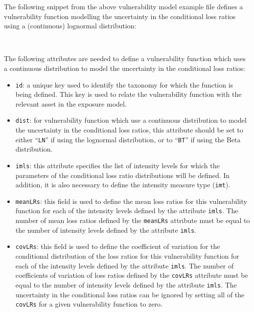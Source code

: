 The following snippet from the above \gls{vulnerability model} example file defines
a \gls{vulnerability function} modelling the uncertainty in the conditional loss
ratios using a (continuous) lognormal distribution:

\inputminted[firstline=10,firstnumber=10,lastline=14,fontsize=\footnotesize,frame=single,linenos,bgcolor=lightgray]{xml}{oqum/risk/Verbatim/input_vulnerability.xml}\\

The following attributes are needed to define a \gls{vulnerability function} which
uses a continuous distribution to model the uncertainty in the conditional
loss ratios:

\begin{itemize}

    \item \Verb+id+: a unique key used to identify the \gls{taxonomy} for 
    which the function is being defined. This key is used to relate the 
    \gls{vulnerability function} with the relevant \gls{asset} in the 
    \gls{exposure model}.

    \item \Verb+dist+: for vulnerability function which use a continuous 
    distribution to model the uncertainty in the conditional loss ratios, 
    this attribute should be set to either ``\Verb+LN+'' if using the lognormal
    distribution, or to ``\Verb+BT+'' if using the Beta distribution.

    \item \Verb+imls+: this attribute specifies the list of intensity levels
    for which the parameters of the conditional loss ratio distributions will
    be defined. In addition, it is also necessary to define the intensity 
    measure type (\Verb+imt+).

    \item \Verb+meanLRs+: this field is used to define the mean loss ratios
    for this \gls{vulnerability function} for each of the intensity levels
    defined by the attribute \Verb+imls+. The number of mean loss ratios
    defined by the \Verb+meanLRs+ attribute must be equal to the number of
    intensity levels defined by the attribute \Verb+imls+.

    \item \Verb+covLRs+: this field is used to define the coefficient of 
    variation for the conditional distribution of the loss ratios for this
    \gls{vulnerability function} for each of the intensity levels defined by
    the attribute \Verb+imls+. The number of coefficients of variation of loss
    ratios defined by the \Verb+covLRs+ attribute must be equal to the number
    of intensity levels defined by the attribute \Verb+imls+. The uncertainty
    in the conditional loss ratios can be ignored by setting all of the
    \Verb+covLRs+ for a given \gls{vulnerability function} to zero.

\end{itemize}


